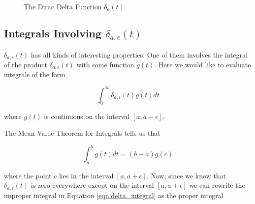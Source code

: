 \documentclass{article}
\theoremstyle{definition}
\begin{document}
\begin{figure}[H]
  \centering
  \caption{The Dirac Delta Function $\delta_{a}(t)$}
  \label{fig:delta_limit}
\end{figure}


\subsection{Integrals Involving $\delta_{a,\epsilon}(t)$}
$\delta_{a,\epsilon}(t)$ has all kinds of interesting properties. One of them involves the integral of the product $\delta_{a,\epsilon}(t)$ with some function $g(t)$.  
Here we would like to evaluate integrals of the form

\bigskip
\begin{equation}
  \int_{0}^{\infty} \delta_{a,\epsilon}(t) g(t) dt
  \label{eqn:delta_integral}
\end{equation}

\bigskip
\noindent
where $g(t)$ is continuous on the interval $[a, a+\epsilon]$. 
 
\bigskip
\noindent
The Mean Value Theorem for Integrals  \cite{wiki:meam_value_theorem_for_integrals}  tells us that

\begin{equation}
  \int_{a}^{b} g(t) dt = (b -a) g(c)
  \label{eqn:mvti}
\end{equation}

\bigskip
\noindent
where the point $c$ lies in the interval $[a, a+\epsilon]$. Now, since we know that $\delta_{a,\epsilon}(t)$ is zero everywhere except on the interval
$[a, a+\epsilon]$ we can rewrite the improper integral in Equation \ref{eqn:delta_integral} as the proper integral
\end{document}
